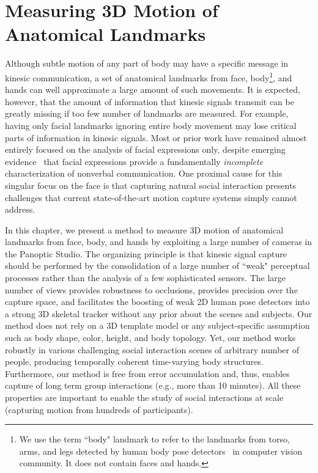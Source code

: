 
\chapter{Measuring 3D Motion of Anatomical Landmarks}
\label{chapter:mocap}

Although subtle motion of any part of body may have a specific message in kinesic communication, a set of anatomical landmarks from face, body\footnote{We use the term ``body" landmark to refer to the landmarks from torso, arms, and legs detected by human body pose detectors~\cite{Belagiannis2014, Wei2016} in computer vision community. It does not contain faces and hands.}, and hands can well approximate a large amount of such movements. It is expected, however, that the amount of information that kinesic signals transmit can be greatly missing if too few number of landmarks are measured. For example, having only facial landmarks ignoring entire body movement may lose critical parts of information in kinesic signals. Most or prior work have remained almost entirely focused on the analysis of facial expressions only, despite emerging evidence~\cite{Meeren-2005,Aviezer-2012} that facial expressions provide a fundamentally \emph{incomplete} characterization of nonverbal communication. One proximal cause for this singular focus on the face is that capturing natural social interaction presents challenges that current state-of-the-art motion capture systems simply cannot address. %

In this chapter, we present a method to measure 3D motion of anatomical landmarks from face, body, and hands by exploiting a large number of cameras in the Panoptic Studio. The organizing principle is that kinesic signal capture should be performed by the consolidation of a large number of ``weak" perceptual processes rather than the analysis of a few sophisticated sensors. The large number of views provides robustness to occlusions, provides precision over the capture space, and facilitates the boosting of weak 2D human pose detectors into a strong 3D skeletal tracker without any prior about the scenes and subjects. Our method does not rely on a 3D template model or any subject-specific assumption such as body shape, color, height, and body topology. Yet, our method works robustly in various challenging social interaction scenes of arbitrary number of people, producing temporally coherent time-varying body structures. Furthermore, our method is free from error accumulation and, thus, enables capture of long term group interactions (e.g., more than 10 minutes). All these properties are important to enable the study of social interactions at scale (capturing motion from hundreds of participants). 

